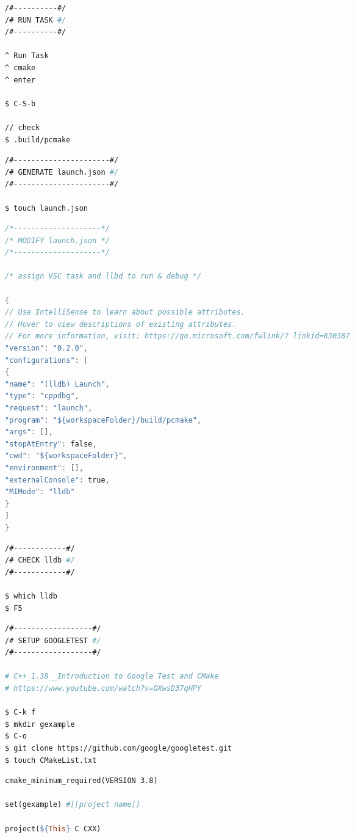 \documentclass[8pt]{extarticle}
\begin{document}
\begin{small}
\begin{multicols}{2}
\begin{lstlisting}[language=bash]
/#----------#/
/# RUN TASK #/
/#----------#/

^ Run Task
^ cmake
^ enter

$ C-S-b

// check
$ .build/pcmake
\end{lstlisting}

\begin{lstlisting}[language=bash]
/#----------------------#/
/# GENERATE launch.json #/
/#----------------------#/

$ touch launch.json
\end{lstlisting}

\begin{lstlisting}[language=C]
/*--------------------*/
/* MODIFY launch.json */
/*--------------------*/

/* assign VSC task and llbd to run & debug */

{
// Use IntelliSense to learn about possible attributes.
// Hover to view descriptions of existing attributes.
// For more information, visit: https://go.microsoft.com/fwlink/? linkid=830387
"version": "0.2.0",
"configurations": [
{
"name": "(lldb) Launch",
"type": "cppdbg",
"request": "launch",
"program": "${workspaceFolder}/build/pcmake",
"args": [],
"stopAtEntry": false,
"cwd": "${workspaceFolder}",
"environment": [],
"externalConsole": true,
"MIMode": "lldb"
}
]
}
\end{lstlisting}
\begin{lstlisting}[language=bash]
/#------------#/
/# CHECK lldb #/
/#------------#/

$ which lldb
$ F5

\end{lstlisting}
\begin{lstlisting}[language=bash]
/#------------------#/
/# SETUP GOOGLETEST #/
/#------------------#/

# C++_1.38__Introduction to Google Test and CMake
# https://www.youtube.com/watch?v=OXwsD37qHPY

$ C-k f
$ mkdir gexample
$ C-o
$ git clone https://github.com/google/googletest.git
$ touch CMakeList.txt
\end{lstlisting}

\begin{lstlisting}[language=make]
cmake_minimum_required(VERSION 3.8)

set(gexample) #[[project name]]

project(${This} C CXX)


\end{lstlisting}
\end{multicols}
\end{small}
\end{document}
